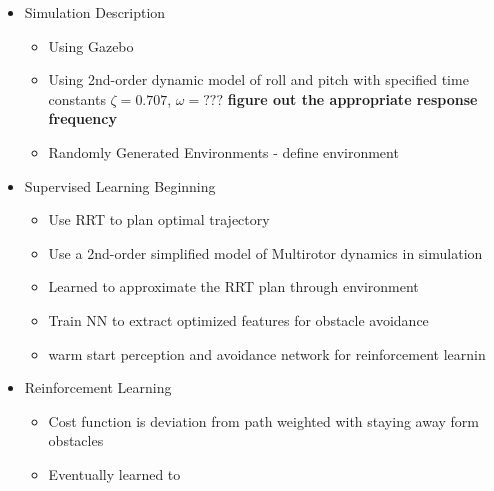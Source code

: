 \documentclass[paper=a4, fontsize=11pt]{scrartcl} %
\begin{document}
\begin{itemize}
	\item Simulation Description
	\begin{itemize}
		\item Using Gazebo
		\item Using 2nd-order dynamic model of roll and pitch with specified time constants $\zeta=0.707$, $\omega=???$ \textbf{figure out the appropriate response frequency}
		\item Randomly Generated Environments - define environment
	\end{itemize}
	\item Supervised Learning Beginning
	\begin{itemize}
		\item Use RRT to plan optimal trajectory
		\item Use a 2nd-order simplified model of Multirotor dynamics in simulation
		\item Learned to approximate the RRT plan through environment
		\item Train NN to extract optimized features for obstacle avoidance
		\item warm start perception and avoidance network for reinforcement learnin
	\end{itemize}
	\item Reinforcement Learning
	\begin{itemize}
		\item Cost function is deviation from path weighted with staying away form obstacles
		\item Eventually learned to 
	\end{itemize}
\end{itemize}
\end{document}
